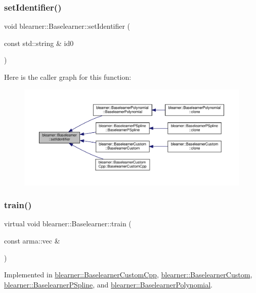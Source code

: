 \subsubsection{\texorpdfstring{set\+Identifier()}{setIdentifier()}}
{\footnotesize\ttfamily void blearner\+::\+Baselearner\+::set\+Identifier (\begin{DoxyParamCaption}\item[{const std\+::string \&}]{id0 }\end{DoxyParamCaption})}

Here is the caller graph for this function\+:
\nopagebreak
\begin{figure}[H]
\begin{center}
\leavevmode
\includegraphics[width=350pt]{classblearner_1_1_baselearner_a6669906a481cbdd516dce8df6f6e5b76_icgraph}
\end{center}
\end{figure}
\mbox{\label{classblearner_1_1_baselearner_a40e03ad070b9a03aae706d9ee8094b80}} 
\subsubsection{\texorpdfstring{train()}{train()}}
{\footnotesize\ttfamily virtual void blearner\+::\+Baselearner\+::train (\begin{DoxyParamCaption}\item[{const arma\+::vec \&}]{ }\end{DoxyParamCaption})\hspace{0.3cm}{\ttfamily [pure virtual]}}



Implemented in \hyperlink{classblearner_1_1_baselearner_custom_cpp_a7437b1175498b928d3202b586527d2c4}{blearner\+::\+Baselearner\+Custom\+Cpp}, \hyperlink{classblearner_1_1_baselearner_custom_a31e3921f86f267d36135d07bf1d16551}{blearner\+::\+Baselearner\+Custom}, \hyperlink{classblearner_1_1_baselearner_p_spline_a48935f40abc8b393b674c39f4efcff25}{blearner\+::\+Baselearner\+P\+Spline}, and \hyperlink{classblearner_1_1_baselearner_polynomial_af8bc28904ebce13e78d0e4a361725f26}{blearner\+::\+Baselearner\+Polynomial}.

